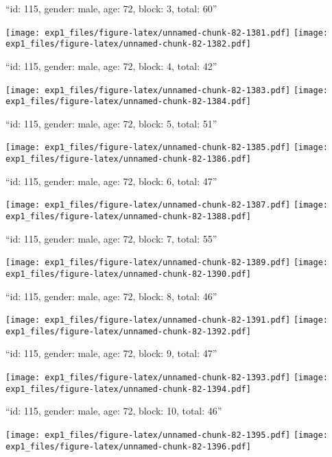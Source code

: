 \documentclass[11pt,,]{article}
\begin{document}
\newpage
[1] 

``id: 115, gender: male, age: 72, block: 3, total: 60''

\texttt{[image: exp1\_files/figure-latex/unnamed-chunk-82-1381.pdf]}
\texttt{[image: exp1\_files/figure-latex/unnamed-chunk-82-1382.pdf]}

\newpage
[1] 

``id: 115, gender: male, age: 72, block: 4, total: 42''

\texttt{[image: exp1\_files/figure-latex/unnamed-chunk-82-1383.pdf]}
\texttt{[image: exp1\_files/figure-latex/unnamed-chunk-82-1384.pdf]}

\newpage
[1] 

``id: 115, gender: male, age: 72, block: 5, total: 51''

\texttt{[image: exp1\_files/figure-latex/unnamed-chunk-82-1385.pdf]}
\texttt{[image: exp1\_files/figure-latex/unnamed-chunk-82-1386.pdf]}

\newpage
[1] 

``id: 115, gender: male, age: 72, block: 6, total: 47''

\texttt{[image: exp1\_files/figure-latex/unnamed-chunk-82-1387.pdf]}
\texttt{[image: exp1\_files/figure-latex/unnamed-chunk-82-1388.pdf]}

\newpage
[1] 

``id: 115, gender: male, age: 72, block: 7, total: 55''

\texttt{[image: exp1\_files/figure-latex/unnamed-chunk-82-1389.pdf]}
\texttt{[image: exp1\_files/figure-latex/unnamed-chunk-82-1390.pdf]}

\newpage
[1] 

``id: 115, gender: male, age: 72, block: 8, total: 46''

\texttt{[image: exp1\_files/figure-latex/unnamed-chunk-82-1391.pdf]}
\texttt{[image: exp1\_files/figure-latex/unnamed-chunk-82-1392.pdf]}

\newpage
[1] 

``id: 115, gender: male, age: 72, block: 9, total: 47''

\texttt{[image: exp1\_files/figure-latex/unnamed-chunk-82-1393.pdf]}
\texttt{[image: exp1\_files/figure-latex/unnamed-chunk-82-1394.pdf]}

\newpage
[1] 

``id: 115, gender: male, age: 72, block: 10, total: 46''

\texttt{[image: exp1\_files/figure-latex/unnamed-chunk-82-1395.pdf]}
\texttt{[image: exp1\_files/figure-latex/unnamed-chunk-82-1396.pdf]}
\end{document}
